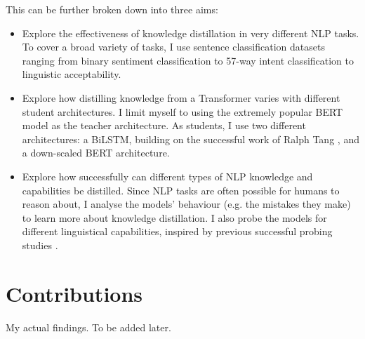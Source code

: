 \documentclass[bsc,frontabs,twoside,singlespacing,parskip,deptreport]{infthesis}
\begin{document}
{{    This can be further broken down into three aims:
    \begin{itemize}
      \item Explore the effectiveness of knowledge distillation in very different NLP tasks. To cover a broad variety of tasks, I use sentence classification datasets ranging from binary sentiment classification to 57-way intent classification to linguistic acceptability.
      \item Explore how distilling knowledge from a Transformer varies with different student architectures. I limit myself to using the extremely popular BERT model \citep{Devlin_2018} as the teacher architecture. As students, I use two different architectures: a BiLSTM, building on the successful work of Ralph Tang \citep{Tang_2019a,Tang_2019b}, and a down-scaled BERT architecture.
      \item Explore how successfully can different types of NLP knowledge and capabilities be distilled. Since NLP tasks are often possible for humans to reason about, I analyse the models' behaviour (e.g. the mistakes they make) to learn more about knowledge distillation. I also probe the models for different linguistical capabilities, inspired by previous successful probing studies \citep{Conneau_2018,Tenney_2019b}.
    \end{itemize}
  }
  
  \section{Contributions}{
    My actual findings. To be added later.
  }
}

\end{document}

